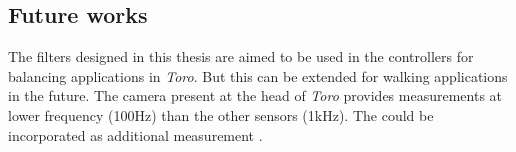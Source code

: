 \subsection{Future works}
The filters designed in this thesis are aimed to be used in the controllers for balancing applications in \emph{Toro}. But this can be extended for walking applications in the future. The camera present at the head of \emph{Toro} provides measurements at lower frequency (100Hz) than the other sensors (1kHz). The could be incorporated as additional measurement \citep{vis12}.